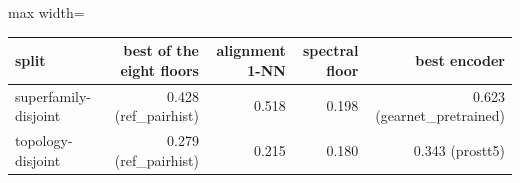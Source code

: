 \begin{adjustbox}{max width=\linewidth}
\begin{tabular}{lrrrr}
\toprule
\rowcolor{CompassLavender!32}
split & best of the eight floors & alignment 1-NN & spectral floor & best encoder \\
\midrule
superfamily-disjoint & 0.428 (ref\_pairhist) & 0.518 & 0.198 & 0.623 (gearnet\_pretrained) \\
topology-disjoint & 0.279 (ref\_pairhist) & 0.215 & 0.180 & 0.343 (prostt5) \\
\bottomrule
\end{tabular}
\end{adjustbox}
